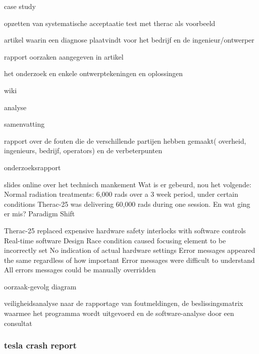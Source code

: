 \cite{huffbrown2004casestudyethicatherac}
case study

\cite{sebowikimedicalradiation}
opzetten van systematische acceptaatie test met therac als voorbeeld

\cite{hsia1995testtherac25}
artikel waarin een diagnose plaatvindt voor het bedrijf en de ingenieur/ontwerper

\cite{magsilvaTheracTesting}
rapport
oorzaken aangegeven in artikel

\cite{chemeuropetherac25}
het onderzoek en enkele ontwerptekeningen en oplossingen

\cite{statsenko10102016Therackillerbug}

\cite{therac25casestudy}

\cite{thomas1994theracinLotos}

\cite{twitter2019programmerbehindtherac}
wiki

\cite{wikibookstherac}
analyse

\cite{bozdagTherac25}
samenvatting


\cite{levesonTurnerTheracAbstract}

rapport over de fouten die de verschillende partijen hebben gemaakt( overheid, ingenieurs, bedrijf, operators) en de verbeterpunten


onderzoeksrapport


slides online over het technisch mankement
Wat is er gebeurd, nou het volgende:
Normal radiation treatments: 6,000 rads over a 3 week period, under certain conditions Therac-25 was delivering 60,000 rads during one session.
En wat ging er mis?
Paradigm Shift

Therac-25 replaced expensive hardware safety interlocks with software controls
Real-time software
Design
Race condition caused focusing element to be incorrectly set
No indication of actual hardware settings
Error messages appeared the same regardless of how important
Error messages were difficult to understand
All errors messages could be manually overridden



oorzaak-gevolg diagram


veiligheidsanalyse naar de rapportage van foutmeldingen, de beslissingsmatrix waarmee het programma wordt uitgevoerd en de software-analyse door een consultat

\cite{stackexchange2021therac25code}


\subsubsection{tesla crash report}


